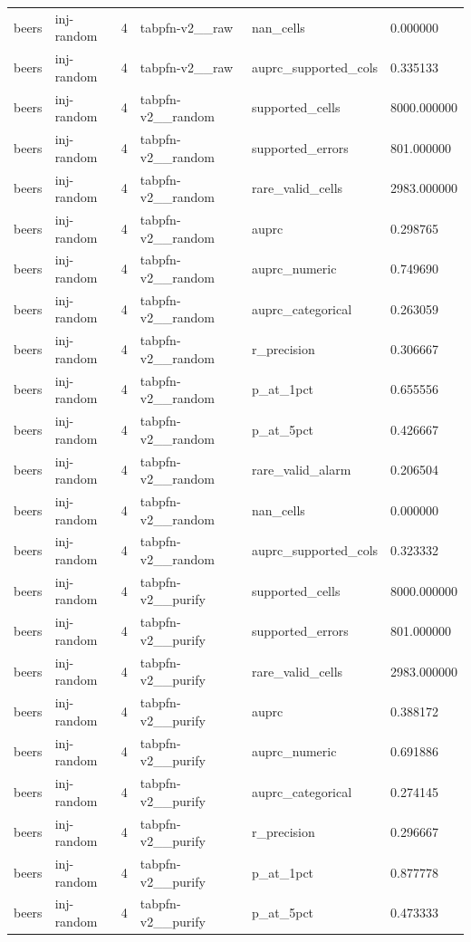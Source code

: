 \begin{tabular}{llllll}
beers & inj-random & 4 & tabpfn-v2\_\_raw & nan\_cells & 0.000000 \\
beers & inj-random & 4 & tabpfn-v2\_\_raw & auprc\_supported\_cols & 0.335133 \\
beers & inj-random & 4 & tabpfn-v2\_\_random & supported\_cells & 8000.000000 \\
beers & inj-random & 4 & tabpfn-v2\_\_random & supported\_errors & 801.000000 \\
beers & inj-random & 4 & tabpfn-v2\_\_random & rare\_valid\_cells & 2983.000000 \\
beers & inj-random & 4 & tabpfn-v2\_\_random & auprc & 0.298765 \\
beers & inj-random & 4 & tabpfn-v2\_\_random & auprc\_numeric & 0.749690 \\
beers & inj-random & 4 & tabpfn-v2\_\_random & auprc\_categorical & 0.263059 \\
beers & inj-random & 4 & tabpfn-v2\_\_random & r\_precision & 0.306667 \\
beers & inj-random & 4 & tabpfn-v2\_\_random & p\_at\_1pct & 0.655556 \\
beers & inj-random & 4 & tabpfn-v2\_\_random & p\_at\_5pct & 0.426667 \\
beers & inj-random & 4 & tabpfn-v2\_\_random & rare\_valid\_alarm & 0.206504 \\
beers & inj-random & 4 & tabpfn-v2\_\_random & nan\_cells & 0.000000 \\
beers & inj-random & 4 & tabpfn-v2\_\_random & auprc\_supported\_cols & 0.323332 \\
beers & inj-random & 4 & tabpfn-v2\_\_purify & supported\_cells & 8000.000000 \\
beers & inj-random & 4 & tabpfn-v2\_\_purify & supported\_errors & 801.000000 \\
beers & inj-random & 4 & tabpfn-v2\_\_purify & rare\_valid\_cells & 2983.000000 \\
beers & inj-random & 4 & tabpfn-v2\_\_purify & auprc & 0.388172 \\
beers & inj-random & 4 & tabpfn-v2\_\_purify & auprc\_numeric & 0.691886 \\
beers & inj-random & 4 & tabpfn-v2\_\_purify & auprc\_categorical & 0.274145 \\
beers & inj-random & 4 & tabpfn-v2\_\_purify & r\_precision & 0.296667 \\
beers & inj-random & 4 & tabpfn-v2\_\_purify & p\_at\_1pct & 0.877778 \\
beers & inj-random & 4 & tabpfn-v2\_\_purify & p\_at\_5pct & 0.473333 \\

\end{tabular}
